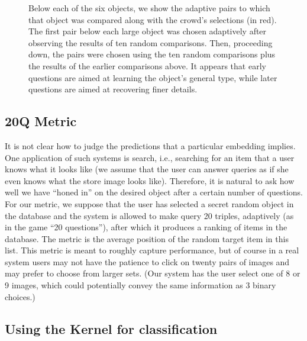 \documentclass{article}
\begin{document}
\begin{figure}
 \caption{\label{fig:adaptive-trips} Below each of the six objects, we show the adaptive pairs to which that object was compared along with the crowd's selections (in red).  The first pair below each large object was chosen adaptively after observing the results of ten random comparisons.  Then, proceeding down, the pairs were chosen using the ten random comparisons plus the results of the earlier comparisons above.  It appears that early questions are aimed at learning the object's general type, while later questions are aimed at recovering finer details.}
\end{figure}


\subsection{20Q Metric}
It is not clear how to judge the predictions that a particular embedding implies.  One application of such systems is search, i.e., searching for an item that a user knows what it looks like (we assume that the user can answer queries as if she even knows what the store image looks like).  Therefore, it is natural to ask how well we have ``honed in'' on the desired object after a certain number of questions.  For our metric, we suppose that the user has selected a secret random object in the database and the system is allowed to make query 20 triples, adaptively (as in the game ``20 questions''), after which it produces a ranking of items in the database.  The metric is the average position of the random target item in this list.  This metric is meant to roughly capture performance, but of course in a real system users may not have the patience to click on twenty pairs of images and may prefer to choose from larger sets. (Our system has the user select one of 8 or 9 images, which could potentially convey the same information as 3 binary choices.)

\subsection{Using the Kernel for classification}
\end{document}
